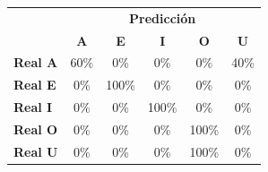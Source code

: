 \begin{tabular}{lccccc}
\toprule
 & \multicolumn{5}{c}{\textbf{Predicción}} \\
 & \textbf{A} & \textbf{E} & \textbf{I} & \textbf{O} & \textbf{U} \\
\midrule
\textbf{Real A} & \cellcolor[rgb]{0.58,0.58,1.00} \color{white} 60\% & \cellcolor[rgb]{1.00,1.00,1.00}  0\% & \cellcolor[rgb]{1.00,1.00,1.00}  0\% & \cellcolor[rgb]{1.00,1.00,1.00}  0\% & \cellcolor[rgb]{0.72,0.72,1.00}  40\% \\
\textbf{Real E} & \cellcolor[rgb]{1.00,1.00,1.00}  0\% & \cellcolor[rgb]{0.30,0.30,1.00} \color{white} 100\% & \cellcolor[rgb]{1.00,1.00,1.00}  0\% & \cellcolor[rgb]{1.00,1.00,1.00}  0\% & \cellcolor[rgb]{1.00,1.00,1.00}  0\% \\
\textbf{Real I} & \cellcolor[rgb]{1.00,1.00,1.00}  0\% & \cellcolor[rgb]{1.00,1.00,1.00}  0\% & \cellcolor[rgb]{0.30,0.30,1.00} \color{white} 100\% & \cellcolor[rgb]{1.00,1.00,1.00}  0\% & \cellcolor[rgb]{1.00,1.00,1.00}  0\% \\
\textbf{Real O} & \cellcolor[rgb]{1.00,1.00,1.00}  0\% & \cellcolor[rgb]{1.00,1.00,1.00}  0\% & \cellcolor[rgb]{1.00,1.00,1.00}  0\% & \cellcolor[rgb]{0.30,0.30,1.00} \color{white} 100\% & \cellcolor[rgb]{1.00,1.00,1.00}  0\% \\
\textbf{Real U} & \cellcolor[rgb]{1.00,1.00,1.00}  0\% & \cellcolor[rgb]{1.00,1.00,1.00}  0\% & \cellcolor[rgb]{1.00,1.00,1.00}  0\% & \cellcolor[rgb]{0.30,0.30,1.00} \color{white} 100\% & \cellcolor[rgb]{1.00,1.00,1.00}  0\% \\
\bottomrule
\end{tabular}